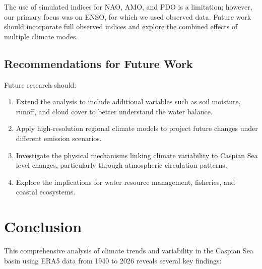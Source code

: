 \documentclass[12pt,a4paper]{article}
\begin{document}
The use of simulated indices for NAO, AMO, and PDO is a limitation; however, our primary focus was on ENSO, for which we used observed data. Future work should incorporate full observed indices and explore the combined effects of multiple climate modes.

\subsection{Recommendations for Future Work}

Future research should:
\begin{enumerate}
    \item Extend the analysis to include additional variables such as soil moisture, runoff, and cloud cover to better understand the water balance.
    \item Apply high-resolution regional climate models to project future changes under different emission scenarios.
    \item Investigate the physical mechanisms linking climate variability to Caspian Sea level changes, particularly through atmospheric circulation patterns.
    \item Explore the implications for water resource management, fisheries, and coastal ecosystems.
\end{enumerate}

\section{Conclusion}

This comprehensive analysis of climate trends and variability in the Caspian Sea basin using ERA5 data from 1940 to 2026 reveals several key findings:
\end{document}
